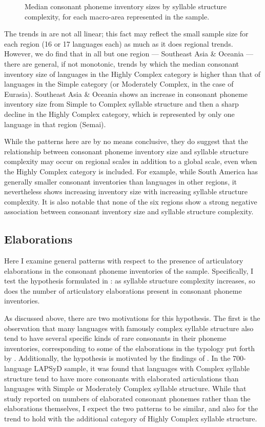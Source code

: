 \begin{figure}  
\caption{\label{fig:4.3} Median consonant phoneme inventory sizes by syllable structure complexity, for each macro-area represented in the sample.}
\end{figure}

  The trends in  are not all linear; this fact may reflect the small sample size for each region (16 or 17 languages each) as much as it does regional trends. However, we do find that in all but one region — Southeast Asia \& Oceania — there are general, if not monotonic, trends by which the median consonant inventory size of languages in the Highly Complex category is higher than that of languages in the Simple category (or Moderately Complex, in the case of Eurasia). Southeast Asia \& Oceania shows an increase in consonant phoneme inventory size from Simple to Complex syllable structure and then a sharp decline in the Highly Complex category, which is represented by only one language in that region (Semai).

  While the patterns here are by no means conclusive, they do suggest that the relationship between consonant phoneme inventory size and syllable structure complexity may occur on regional scales in addition to a global scale, even when the Highly Complex category is included. For example, while South America has generally smaller consonant inventories than languages in other regions, it nevertheless shows increasing inventory size with increasing syllable structure complexity. It is also notable that none of the six regions show a strong negative association between consonant inventory size and syllable structure complexity.

\subsection{Elaborations}\label{sec:4.4.2}

  Here I examine general patterns with respect to the presence of articulatory elaborations in the consonant phoneme inventories of the sample. Specifically, I test the hypothesis formulated in : as syllable structure complexity increases, so does the number of articulatory elaborations present in consonant phoneme inventories.

  As discussed above, there are two motivations for this hypothesis. The first is the observation that many languages with famously complex syllable structure also tend to have several specific kinds of rare consonants in their phoneme inventories, corresponding to some of the elaborations in the typology put forth by \citet{LindblomMaddieson1988}. Additionally, the hypothesis is motivated by the findings of \citet{MaddiesonEtAl2013}. In the 700-language LAPSyD sample, it was found that languages with Complex syllable structure tend to have more consonants with elaborated articulations than languages with Simple or Moderately Complex syllable structure. While that study reported on numbers of elaborated consonant phonemes rather than the elaborations themselves, I expect the two patterns to be similar, and also for the trend to hold with the additional category of Highly Complex syllable structure.

